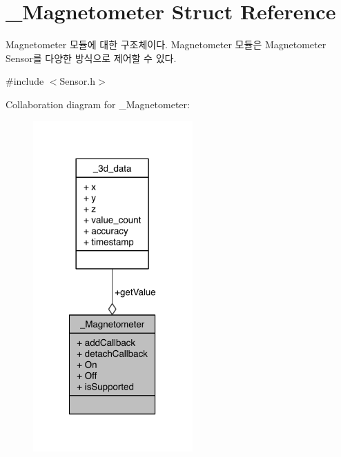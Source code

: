\hypertarget{struct__Magnetometer}{\section{\-\_\-\-Magnetometer Struct Reference}
\label{struct__Magnetometer}
}


Magnetometer 모듈에 대한 구조체이다. Magnetometer 모듈은 Magnetometer Sensor를 다양한 방식으로 제어할 수 있다.  




{\ttfamily \#include $<$Sensor.\-h$>$}



Collaboration diagram for \-\_\-\-Magnetometer\-:\nopagebreak
\begin{figure}[H]
\begin{center}
\leavevmode
\includegraphics[width=173pt]{db/d36/struct__Magnetometer__coll__graph}
\end{center}
\end{figure}
